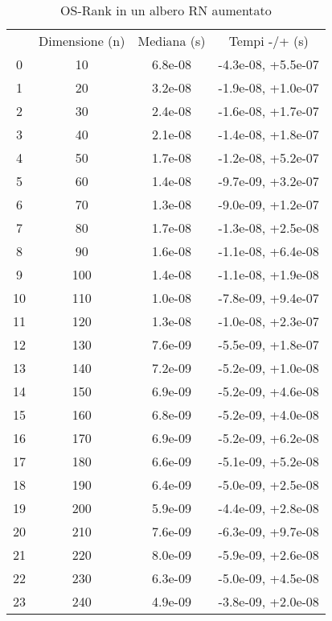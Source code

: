 \begin{table}
\centering
\caption{OS-Rank in un albero RN aumentato}
\label{OS-Rank in un albero RN aumentato}
\begin{adjustbox}{width=1\textwidth/2}
\begin{tabular}{|c|c|c|c|}
\hline
 & Dimensione (n) & Mediana (s) & Tempi -/+ (s) \\
0 & 10 & 6.8e-08 & -4.3e-08, +5.5e-07 \\
\cline{1-4}
1 & 20 & 3.2e-08 & -1.9e-08, +1.0e-07 \\
\cline{1-4}
2 & 30 & 2.4e-08 & -1.6e-08, +1.7e-07 \\
\cline{1-4}
3 & 40 & 2.1e-08 & -1.4e-08, +1.8e-07 \\
\cline{1-4}
4 & 50 & 1.7e-08 & -1.2e-08, +5.2e-07 \\
\cline{1-4}
5 & 60 & 1.4e-08 & -9.7e-09, +3.2e-07 \\
\cline{1-4}
6 & 70 & 1.3e-08 & -9.0e-09, +1.2e-07 \\
\cline{1-4}
7 & 80 & 1.7e-08 & -1.3e-08, +2.5e-08 \\
\cline{1-4}
8 & 90 & 1.6e-08 & -1.1e-08, +6.4e-08 \\
\cline{1-4}
9 & 100 & 1.4e-08 & -1.1e-08, +1.9e-08 \\
\cline{1-4}
10 & 110 & 1.0e-08 & -7.8e-09, +9.4e-07 \\
\cline{1-4}
11 & 120 & 1.3e-08 & -1.0e-08, +2.3e-07 \\
\cline{1-4}
12 & 130 & 7.6e-09 & -5.5e-09, +1.8e-07 \\
\cline{1-4}
13 & 140 & 7.2e-09 & -5.2e-09, +1.0e-08 \\
\cline{1-4}
14 & 150 & 6.9e-09 & -5.2e-09, +4.6e-08 \\
\cline{1-4}
15 & 160 & 6.8e-09 & -5.2e-09, +4.0e-08 \\
\cline{1-4}
16 & 170 & 6.9e-09 & -5.2e-09, +6.2e-08 \\
\cline{1-4}
17 & 180 & 6.6e-09 & -5.1e-09, +5.2e-08 \\
\cline{1-4}
18 & 190 & 6.4e-09 & -5.0e-09, +2.5e-08 \\
\cline{1-4}
19 & 200 & 5.9e-09 & -4.4e-09, +2.8e-08 \\
\cline{1-4}
20 & 210 & 7.6e-09 & -6.3e-09, +9.7e-08 \\
\cline{1-4}
21 & 220 & 8.0e-09 & -5.9e-09, +2.6e-08 \\
\cline{1-4}
22 & 230 & 6.3e-09 & -5.0e-09, +4.5e-08 \\
\cline{1-4}
23 & 240 & 4.9e-09 & -3.8e-09, +2.0e-08 \\

\end{tabular}
\end{adjustbox}
\end{table}
